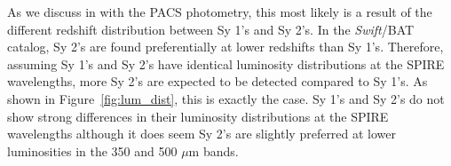 As we discuss in \citet{Melendez:2014yu} with the PACS photometry, this most likely is a result of the different redshift distribution between Sy 1's and Sy 2's. In the \textit{Swift}/BAT catalog, Sy 2's are found preferentially at lower redshifts than Sy 1's. Therefore, assuming Sy 1's and Sy 2's have identical luminosity distributions at the SPIRE wavelengths, more Sy 2's are expected to be detected compared to Sy 1's. As shown in Figure~\ref{fig:lum_dist}, this is exactly the case. Sy 1's and Sy 2's do not show strong differences in their luminosity distributions at the SPIRE wavelengths although it does seem Sy 2's are slightly preferred at lower luminosities in the 350 and 500 $\mu$m bands.